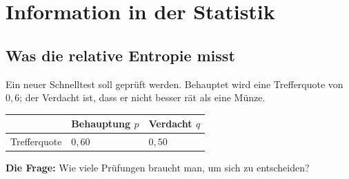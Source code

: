 \chapter{Information in der Statistik}

\section{Was die relative Entropie misst}

\begin{merksatz}
Ein neuer Schnelltest soll geprüft werden. Behauptet wird eine Trefferquote von $0{,}6$; der Verdacht ist, dass er nicht besser rät als eine Münze.

\begin{center}
{\small
\renewcommand{\arraystretch}{1.5}
\begin{tabular}{@{}P{2.0cm}P{2.6cm}P{3.0cm}@{}}
\toprule
& \textbf{Behauptung} $p$ & \textbf{Verdacht} $q$\\
\midrule
Trefferquote & $0{,}60$ & $0{,}50$\\
\bottomrule
\end{tabular}}
\end{center}

\textbf{Die Frage:} Wie viele Prüfungen braucht man, um sich zu entscheiden?

\begin{center}
\begin{minipage}{0.88\textwidth}
\end{minipage}
\end{center}
\end{merksatz}

